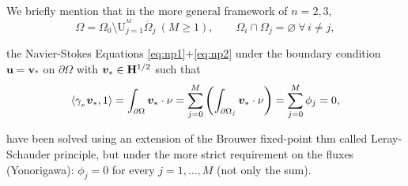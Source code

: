\noindent\rlap{\rule[1.5ex]{0.495\textwidth}{.2pt}}\vspace{-0.3em}


We briefly mention that in the more general framework of $n=2,3$, 
\begin{equation*}
\Omega=\Omega_0\setminus \mathrm{U}_{\scriptscriptstyle j=1}^{^{\scriptscriptstyle M}} \overline{\Omega}_j\ (M\geq 1),\qquad \Omega_i\cap\Omega_j=\varnothing\ \forall\, i\neq j,
\end{equation*}

the Navier-Stokes Equations \eqref{eq:np1}+\eqref{eq:np2} under the boundary condition $\bm u=\bm v_*$ on $\partial \Omega$ with $\bm v_*\in \mathbf{H}^{1/2}$ such that
\vspace{-0.5em}
\begin{equation*}
\left\langle \gamma_{_\nu}\bm v_*,1 \right\rangle=\int_{\partial\Omega}\bm v_*\cdot\nu=\sum_{j=0}^M \left( \int_{\partial\Omega_j} \bm v_*\cdot\nu \right)=\sum_{j=0}^M \phi_j = 0,
\end{equation*}

have been solved using an extension of the Brouwer fixed-point thm called Leray-Schauder principle, $\boxed{\text{but}}$ under the more strict requirement on the fluxes (Yonorigawa): $\phi_j=0$ for every $j=1,\dots,M$ (not only the sum).

\noindent\rlap{\rule[1.5ex]{0.495\textwidth}{.2pt}}

\newpage








